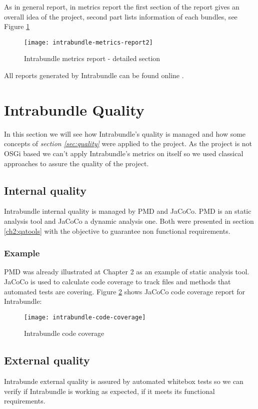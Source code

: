 As in general report, in metrics report the first section of the report gives an overall idea of the project, second part lists information of each bundles, see Figure \ref{intrabundle-metrics-report2} 

\begin{figure}[h]
\caption{Intrabundle metrics report - detailed section}
\label{intrabundle-metrics-report2}
\centering
\texttt{[image: intrabundle-metrics-report2]}
\end{figure}  
\FloatBarrier

All reports generated by Intrabundle can be found online \citep{intrabundle reports 2014}.

\section{Intrabundle Quality}
In this section we will see how Intrabundle's quality is managed and how some concepts of \textit{section \ref{sec:quality}} were applied to the project. As the project is not OSGi based we can't apply Intrabundle's metrics on itself so we used classical approaches to assure the quality of the project.

\subsection{Internal quality}
Intrabundle internal quality is managed by PMD and JaCoCo. PMD is an static analysis tool and JaCoCo a dynamic analysis one. Both were presented in section \ref{ch2:qatools} with the objective to guarantee non functional requirements.

\subsubsection{Example}
 PMD was already illustrated at Chapter 2 as an example of static analysis tool. JaCoCo is used to calculate code coverage to track files and methods that automated tests are covering. Figure \ref{intrabundle-code-cover} shows JaCoCo code coverage report for Intrabundle:

\begin{figure}[h]
\caption{Intrabundle code coverage}
\label{intrabundle-code-cover}
\texttt{[image: intrabundle-code-coverage]}
\end{figure}

\FloatBarrier
\newpage
\subsection{External quality}
Intrabunde external quality is assured by automated whitebox tests so we can verify if Intrabundle is working as expected, if it meets its functional requirements.

